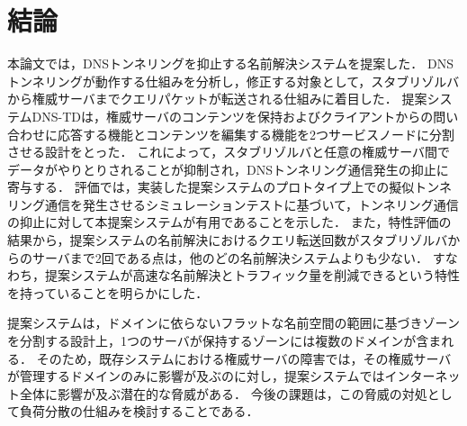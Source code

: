 \section{結論}
本論文では，DNSトンネリングを抑止する名前解決システムを提案した．
DNSトンネリングが動作する仕組みを分析し，修正する対象として，スタブリゾルバから権威サーバまでクエリパケットが転送される仕組みに着目した．
提案システムDNS-TDは，権威サーバのコンテンツを保持およびクライアントからの問い合わせに応答する機能とコンテンツを編集する機能を2つサービスノードに分割させる設計をとった．
これによって，スタブリゾルバと任意の権威サーバ間でデータがやりとりされることが抑制され，DNSトンネリング通信発生の抑止に寄与する．
評価では，実装した提案システムのプロトタイプ上での擬似トンネリング通信を発生させるシミュレーションテストに基づいて，トンネリング通信の抑止に対して本提案システムが有用であることを示した．
また，特性評価の結果から，提案システムの名前解決におけるクエリ転送回数がスタブリゾルバからのサーバまで2回である点は，他のどの名前解決システムよりも少ない．
すなわち，提案システムが高速な名前解決とトラフィック量を削減できるという特性を持っていることを明らかにした．

提案システムは，ドメインに依らないフラットな名前空間の範囲に基づきゾーンを分割する設計上，1つのサーバが保持するゾーンには複数のドメインが含まれる．
そのため，既存システムにおける権威サーバの障害では，その権威サーバが管理するドメインのみに影響が及ぶのに対し，提案システムではインターネット全体に影響が及ぶ潜在的な脅威がある．
今後の課題は，この脅威の対処として負荷分散の仕組みを検討することである．
